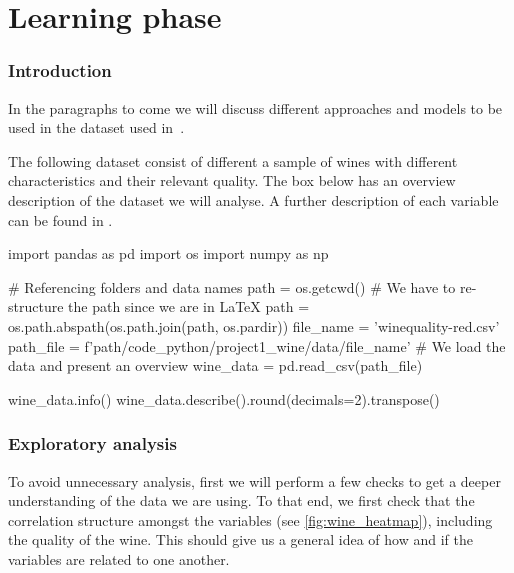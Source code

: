 \documentclass[11pt]{article}
\begin{document}


\tableofcontents\newpage

\part{Learning phase} \label{part:learning}

\section{Introduction}\label{sec:introduction}
In the paragraphs to come we will discuss different approaches and models to be used in the dataset used in~\cite{wine}.

The following dataset consist of different a sample of wines with different characteristics and their relevant
quality.
The box below has an overview description of the dataset we will analyse.
A further description of each variable can be found in .

\begin{pyconcode}
import pandas as pd
import os
import numpy as np

# Referencing folders and data names
path = os.getcwd()
# We have to re-structure the path since we are in LaTeX
path = os.path.abspath(os.path.join(path, os.pardir))
file_name = 'winequality-red.csv'
path_file = f'{path}/code_python/project1_wine/data/{file_name}'
# We load the data and present an overview
wine_data = pd.read_csv(path_file)
\end{pyconcode}

\begin{pyconsole}[][]
wine_data.info()
wine_data.describe().round(decimals=2).transpose()
\end{pyconsole}

\section{Exploratory analysis}\label{sec:exploratory-analysis}

To avoid unnecessary analysis, first we will perform a few checks to get a deeper understanding of the
data we are using.
To that end, we first check that the correlation structure amongst the variables (see \cref{fig:wine_heatmap}),
including the quality of the wine.
This should give us a general idea of how and if the variables are related to one another.
\end{document}
